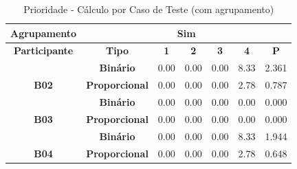 \begin{table}[htbp]
	\centering
	\caption{Prioridade - Cálculo por Caso de Teste (com agrupamento)}
	\begin{tabular}{|c|cccccc|}
		\hline
		\cellcolor[HTML]{F2F2F2}\textbf{Agrupamento} &
		\multicolumn{6}{c|}{Sim} \\ \hline
		\rowcolor[HTML]{D0CECE} 
		\textbf{Participante} &
		\multicolumn{1}{c|}{\cellcolor[HTML]{D0CECE}\textbf{Tipo}} &
		\multicolumn{1}{c|}{\cellcolor[HTML]{D0CECE}\textbf{1}} &
		\multicolumn{1}{c|}{\cellcolor[HTML]{D0CECE}\textbf{2}} &
		\multicolumn{1}{c|}{\cellcolor[HTML]{D0CECE}\textbf{3}} &
		\multicolumn{1}{c|}{\cellcolor[HTML]{D0CECE}\textbf{4}} &
		\textbf{P} \\ \hline
		&
		\multicolumn{1}{c|}{\textbf{Binário}} &
		\multicolumn{1}{c|}{0.00} &
		\multicolumn{1}{c|}{0.00} &
		\multicolumn{1}{c|}{0.00} &
		\multicolumn{1}{c|}{8.33} &
		2.361 \\ \cline{2-7} 
		\multirow{-2}{*}{\textbf{B02}} &
		\multicolumn{1}{l|}{\cellcolor[HTML]{F2F2F2}\textbf{Proporcional}} &
		\multicolumn{1}{c|}{\cellcolor[HTML]{F2F2F2}0.00} &
		\multicolumn{1}{c|}{\cellcolor[HTML]{F2F2F2}0.00} &
		\multicolumn{1}{c|}{\cellcolor[HTML]{F2F2F2}0.00} &
		\multicolumn{1}{c|}{\cellcolor[HTML]{F2F2F2}2.78} &
		\cellcolor[HTML]{F2F2F2}0.787 \\ \hline
		&
		\multicolumn{1}{c|}{\textbf{Binário}} &
		\multicolumn{1}{c|}{0.00} &
		\multicolumn{1}{c|}{0.00} &
		\multicolumn{1}{c|}{0.00} &
		\multicolumn{1}{c|}{0.00} &
		0.000 \\ \cline{2-7} 
		\multirow{-2}{*}{\textbf{B03}} &
		\multicolumn{1}{l|}{\cellcolor[HTML]{F2F2F2}\textbf{Proporcional}} &
		\multicolumn{1}{c|}{\cellcolor[HTML]{F2F2F2}0.00} &
		\multicolumn{1}{c|}{\cellcolor[HTML]{F2F2F2}0.00} &
		\multicolumn{1}{c|}{\cellcolor[HTML]{F2F2F2}0.00} &
		\multicolumn{1}{c|}{\cellcolor[HTML]{F2F2F2}0.00} &
		\cellcolor[HTML]{F2F2F2}0.000 \\ \hline
		&
		\multicolumn{1}{c|}{\textbf{Binário}} &
		\multicolumn{1}{c|}{0.00} &
		\multicolumn{1}{c|}{0.00} &
		\multicolumn{1}{c|}{0.00} &
		\multicolumn{1}{c|}{8.33} &
		1.944 \\ \cline{2-7} 
		\multirow{-2}{*}{\textbf{B04}} &
		\multicolumn{1}{l|}{\cellcolor[HTML]{F2F2F2}\textbf{Proporcional}} &
		\multicolumn{1}{c|}{\cellcolor[HTML]{F2F2F2}0.00} &
		\multicolumn{1}{c|}{\cellcolor[HTML]{F2F2F2}0.00} &
		\multicolumn{1}{c|}{\cellcolor[HTML]{F2F2F2}0.00} &
		\multicolumn{1}{c|}{\cellcolor[HTML]{F2F2F2}2.78} &
		\cellcolor[HTML]{F2F2F2}0.648 \\ \hline

\end{tabular}
\end{table}
